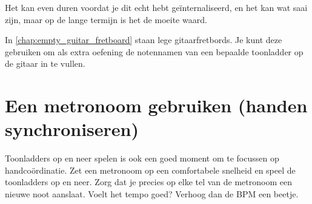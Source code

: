 Het kan even duren voordat je dit echt hebt geïnternaliseerd, en het kan wat saai zijn, maar op de lange termijn is het de moeite waard.

In \autoref{chap:empty_guitar_fretboard} staan lege gitaarfretbords. Je kunt deze gebruiken om als extra oefening de notennamen van een bepaalde toonladder op de gitaar in te vullen.

\section{Een metronoom gebruiken (handen synchroniseren)}

Toonladders op en neer spelen is ook een goed moment om te focussen op handcoördinatie. Zet een metronoom op een comfortabele snelheid en speel de toonladders op en neer. Zorg dat je precies op elke tel van de metronoom een nieuwe noot aanslaat. Voelt het tempo goed? Verhoog dan de BPM een beetje.


